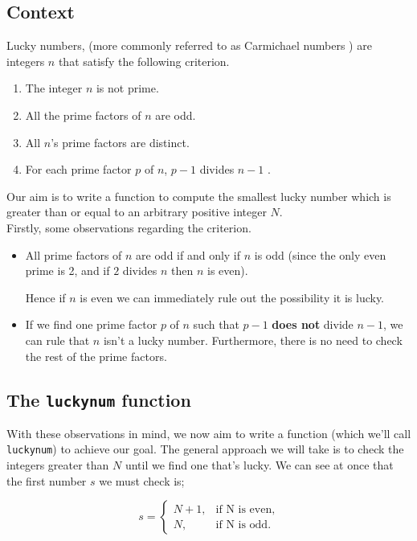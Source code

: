 \documentclass[10pt]{article}
\begin{document}
\subsection{Context}
Lucky numbers, (more commonly referred to as Carmichael numbers \cite{carmichael}) are integers $n$ that satisfy the following criterion.

\begin{enumerate}
\item The integer $n$ is not prime.
\item All the prime factors of $n$ are odd.
\item All $n$'s prime factors are distinct.
\item For each prime factor $p$ of $n$, $p - 1$ divides $n-1$ .
\end{enumerate}
 
\noindent Our aim is to write a function to compute the smallest lucky number which is greater than or equal to an arbitrary positive integer $N$. \\

\noindent Firstly, some observations regarding the criterion.

\begin{itemize}

\item All prime factors of $n$ are odd if and only if $n$ is odd (since the only even prime is 2, and if $2$ divides $n$ then $n$ is even).
 
 Hence if $n$ is even we can immediately rule out the possibility it is lucky.
\item If we find one prime factor $p$ of $n$ such that $p -1$ \textbf{does not} divide $n-1$, we can rule that $n$ isn't a lucky number. Furthermore, there is no need to check the rest of the prime factors.
\end{itemize}

\subsection{The \texttt{luckynum} function}

With these observations in mind, we now aim to write a function (which we'll call \texttt{luckynum}) to achieve our goal. The general approach  we will take is to check the integers greater than $N$ until we find one that's lucky. We can see at once that the first number $s$ we must check is;

$$ s = \begin{cases}
               N + 1,& \text{if N is even,}\\
               N, & \text{if N is odd.}
            \end{cases}
$$
\end{document}
